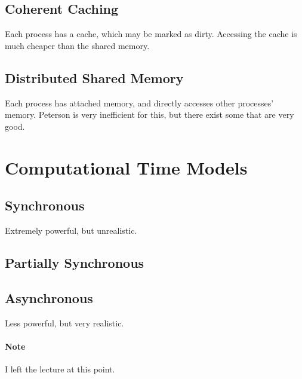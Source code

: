 \documentclass[a4paper]{article}
\begin{document}
\subsection{Coherent Caching}
Each process has a cache, which may be marked as dirty.
Accessing the cache is much cheaper than the shared memory.

\subsection{Distributed Shared Memory}
Each process has attached memory, and directly accesses other processes' memory.
Peterson is very inefficient for this, but there exist some that are very good.


\section{Computational Time Models}

\subsection{Synchronous}
Extremely powerful, but unrealistic.

\subsection{Partially Synchronous}

\subsection{Asynchronous}
Less powerful, but very realistic.

\paragraph{Note}
I left the lecture at this point.
\end{document}
